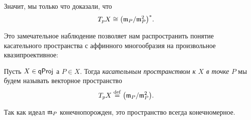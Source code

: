 	Значит, мы только что доказали, что 
	\[
		T_{p}X \cong \lr*{\fm_P/\fm_P^2}^*.
	\]

	Это замечательное наблюдение позволяет нам распространить понятие касательного пространства с аффинного многообразия на произвольное квазипроективное: 
	
	\begin{definition} 
		Пусть $X \in \mathsf{qProj}$ а $P \in X$. Тогда \emph{касательным пространством к $X$ в точке $P$} мы будем называть векторное пространство 
		\[
			T_{p}X \eqdef \lr*{\fm_P/\fm_P^2}.
		\]
	\end{definition}

	\begin{remark}
	 	Так как идеал $\mathfrak{m}_P$ конечнопорожден, это пространство всегда конечномерное. 
	 \end{remark}

